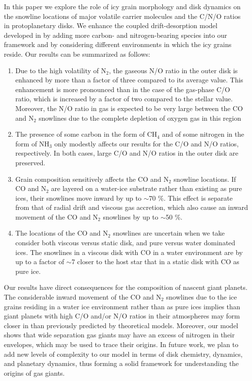 \documentclass[apj]{emulateapj}
\begin{document}
In this paper we explore the role of icy grain morphology and disk dynamics on the snowline locations of major volatile carrier molecules and the C/N/O ratios in protoplanetary disks. We enhance the coupled drift-desorption model developed in \citet{piso15b} by adding more carbon- and nitrogen-bearing species into our framework and by considering different environments in which the icy grains reside. Our results can be summarized as follows:

\begin{enumerate}

\item Due to the high volatility of N$_2$, the gaseous N/O ratio in the outer disk is enhanced by more than a factor of three compared to its average value. This enhancement is more pronounced than in the case of the gas-phase C/O ratio, which is increased by a factor of two compared to the stellar value. Moreover, the N/O ratio in gas is expected to be very large between the CO and N$_2$ snowlines due to the complete depletion of oxygen gas in this region

\item The presence of some carbon in the form of CH$_4$ and of some nitrogen in the form of NH$_3$ only modestly affects our results for the C/O and N/O ratios, respectively. In both cases, large C/O and N/O ratios in the outer disk are preserved.

\item Grain composition sensitively affects the CO and N$_2$ snowline locations. If CO and N$_2$ are layered on a water-ice substrate rather than existing as pure ices, their snowlines move inward by up to $\sim$70 \%. This effect is separate from that of radial drift and viscous gas accretion, which also cause an inward movement of the CO and N$_2$ snowlines by up to $\sim$50 \%. 

\item The locations of the CO and N$_2$ snowlines are uncertain when we take consider both viscous versus static disk, and pure versus water dominated ices. The snowlines in a viscous disk with CO in a water environment are by up to a factor of $\sim$7 closer to the host star that in a static disk with CO as pure ice. 

\end{enumerate}

Our results have direct consequences for the composition of nascent giant planets. The considerable inward movement of the CO and N$_2$ snowlines due to the ice grains residing in a water ice environment rather than as pure ices implies than giant planets with high C/O and/or N/O ratios in their atmospheres may form closer in than previously predicted by theoretical models. Moreover, our model shows that wide separation gas giants may have an excess of nitrogen in their envelopes, which may be used to trace their origins. In future work, we plan to add new levels of complexity to our model in terms of disk chemistry, dynamics, and planetary dynamics, thus forming a solid framework for understanding the origins of gas giants. 
\end{document}
